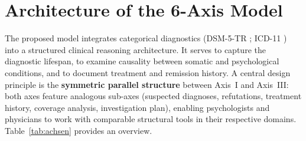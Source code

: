 \documentclass[11pt,a4paper]{article}
\begin{document}
\section{Architecture of the 6-Axis Model}
\label{sec:model}

The proposed model integrates categorical diagnostics (DSM-5-TR \citep{APA2022}; ICD-11 \citep{WHO2019}) into a structured clinical reasoning architecture. It serves to capture the diagnostic lifespan, to examine causality between somatic and psychological conditions, and to document treatment and remission history. A central design principle is the \textbf{symmetric parallel structure} between Axis~I and Axis~III: both axes feature analogous sub-axes (suspected diagnoses, refutations, treatment history, coverage analysis, investigation plan), enabling psychologists and physicians to work with comparable structural tools in their respective domains. Table~\ref{tab:achsen} provides an overview.
\end{document}
